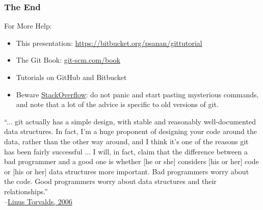 \documentclass{beamer}
\begin{document}
\begin{frame}[fragile]
\frametitle{The End}

For More Help:
\begin{itemize}
\item This presentation: \href{https://bitbucket.org/psanan/gittutorial}{https://bitbucket.org/psanan/gittutorial}
\item
The Git Book: \href{https://git-scm.com/book}{git-scm.com/book}
\item
Tutorials on GitHub and Bitbucket
\item
Beware \href{https://www.stackoverflow.com}{StackOverflow}: do not panic and start pasting mysterious commands, and note that a lot of the advice is specific to old versions of git.
\end{itemize}
\vspace{50px}
{\tiny ``... git actually has a simple design, with stable and reasonably well-documented data structures.
In fact, I'm a huge proponent of designing your code around the data, rather than the other
way around, and I think it's one of the reasons git has been fairly successful ... I will, in
fact, claim that the difference between a bad programmer and a good one is whether [he or she]
considers [his or her] code or [his or her] data structures more important. Bad programmers worry
about the code. Good programmers worry about data structures and their relationships.''\\
--\href{http://lwn.net/Articles/193245/}{Linus Torvalds, 2006}
}
\end{frame}
\end{document}
